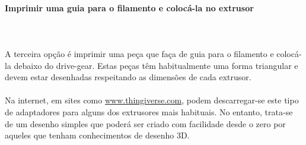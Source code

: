 \documentclass[11pt,a4paper]{article}
\begin{document}
			\paragraph{Imprimir uma guia para o filamento e colocá-la no extrusor}\mbox{}\\\\
A terceira opção é imprimir uma peça que faça de guia para o filamento e colocá-la debaixo do drive-gear. Estas peças têm habitualmente uma forma triangular e devem estar desenhadas respeitando as dimensões de cada extrusor.
\\\\
Na internet, em sites como \url{www.thingiverse.com}, podem descarregar-se este tipo de adaptadores para alguns dos extrusores mais habituais. No entanto, trata-se de um desenho simples que poderá ser criado com facilidade desde o zero por aqueles que tenham conhecimentos de desenho 3D.
\end{document}
